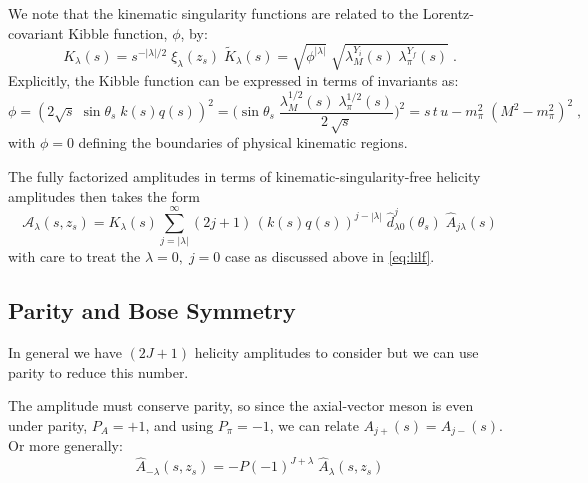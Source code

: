 \documentclass[10pt, aps,prd,amsmath,amssymb,superscriptaddress,onecolumn,
nofootinbib,showpacs,preprintnumbers]{revtex4-1}
\begin{document}
We note that the kinematic singularity functions are related to the Lorentz-covariant Kibble function, \(\phi\), by:
  \begin{equation}
    \label{eq:k-factor}
    K_\lambda(s) = s^{-|\lambda|/2} \; \xi_{\lambda}(z_s) \; \tilde{K}_{\lambda}(s) = \sqrt{\phi^{|\lambda|}} \; \sqrt{\lambda_M^{Y_i}(s) \; \lambda_\pi^{Y_f}(s)}\;  .
  \end{equation}
Explicitly, the Kibble function can be expressed in terms of invariants as:
  \begin{equation}
    \phi = (2\sqrt{s} \; \sin \theta_s \; k(s) q(s))^2 =  \bigg( \sin\theta_s \; \frac{\lambda^{1/2}_M(s) \; \lambda^{1/2}_\pi(s)}{2 \,\sqrt{s}} \bigg)^2 = s \, t\, u - m_\pi^2 \;(M^2 - m_\pi^2)^2 \; ,
  \end{equation}
with \(\phi = 0\) defining the boundaries of physical kinematic regions.

The fully factorized amplitudes in terms of kinematic-singularity-free helicity amplitudes then takes the form
  \begin{equation}
    \label{eq:helicity-final}
    \mathcal{A}_\lambda(s,z_s) =  K_{\lambda}(s)  \sum_{j= |\lambda|}^\infty (2j+1) \, (k(s)q(s))^{j- |\lambda|} \; \hat{d}^j_{\lambda0}(\theta_s)  \; \hat{A}_{j\lambda}(s)
  \end{equation}
with care to treat the \(\lambda =0, \;  j=0\) case as discussed above in \cref{eq:lilf}.
\subsection{Parity and Bose Symmetry} \label{sec:symmetry}
In general we have \((2J+1)\) helicity amplitudes to consider but we can use parity to reduce this number.

The amplitude must conserve parity, so since the axial-vector meson is even under parity, \( P_A = +1\), and using \(P_\pi = -1\), we can relate \(A_{j+}(s) = A_{j-}(s)\). Or more generally:
  \begin{equation}
    \label{parity-jpc}
    \hat{A}_{-\lambda}(s,z_s) = -P(-1)^{J+\lambda} \; \hat{A}_{\lambda}(s,z_s)
  \end{equation}
\end{document}
